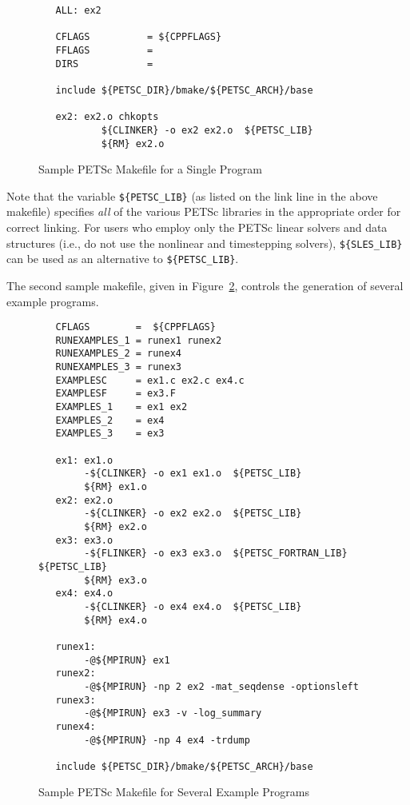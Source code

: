 \begin{figure}[H]
{\small
\begin{verbatim}
   ALL: ex2

   CFLAGS          = ${CPPFLAGS} 
   FFLAGS          = 
   DIRS            = 

   include ${PETSC_DIR}/bmake/${PETSC_ARCH}/base

   ex2: ex2.o chkopts
           ${CLINKER} -o ex2 ex2.o  ${PETSC_LIB}
           ${RM} ex2.o
\end{verbatim}
}
\caption{Sample PETSc Makefile for a Single Program}
\label{fig:make1}
\end{figure}


 
Note that the variable {\tt \$\{PETSC\_LIB\}} (as listed on the link
line in the above makefile) specifies {\em all} of the various PETSc
libraries in the appropriate order for correct linking.  For users who
employ only the PETSc linear solvers and data structures (i.e., do not
use the nonlinear and timestepping solvers), {\tt \$\{SLES\_LIB\}} can
be used as an alternative to {\tt \$\{PETSC\_LIB\}}.

The second sample makefile, given in Figure~\ref{fig:make2},
controls the generation of several example programs. 

\begin{figure}[H]
{\small
\begin{verbatim}
   CFLAGS        =  ${CPPFLAGS}
   RUNEXAMPLES_1 = runex1 runex2
   RUNEXAMPLES_2 = runex4
   RUNEXAMPLES_3 = runex3
   EXAMPLESC     = ex1.c ex2.c ex4.c
   EXAMPLESF     = ex3.F
   EXAMPLES_1    = ex1 ex2
   EXAMPLES_2    = ex4
   EXAMPLES_3    = ex3

   ex1: ex1.o 
        -${CLINKER} -o ex1 ex1.o  ${PETSC_LIB}
        ${RM} ex1.o
   ex2: ex2.o 
        -${CLINKER} -o ex2 ex2.o  ${PETSC_LIB}
        ${RM} ex2.o
   ex3: ex3.o 
        -${FLINKER} -o ex3 ex3.o  ${PETSC_FORTRAN_LIB} ${PETSC_LIB}
        ${RM} ex3.o
   ex4: ex4.o 
        -${CLINKER} -o ex4 ex4.o  ${PETSC_LIB}
        ${RM} ex4.o

   runex1:
        -@${MPIRUN} ex1
   runex2:
        -@${MPIRUN} -np 2 ex2 -mat_seqdense -optionsleft
   runex3:
        -@${MPIRUN} ex3 -v -log_summary
   runex4:
        -@${MPIRUN} -np 4 ex4 -trdump

   include ${PETSC_DIR}/bmake/${PETSC_ARCH}/base
\end{verbatim}
}
\caption{Sample PETSc Makefile for Several Example Programs}
\label{fig:make2}
\end{figure}

